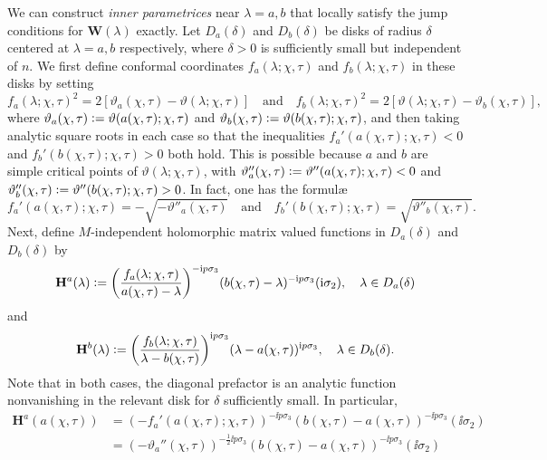 We can construct \emph{inner parametrices} near $\lambda=a,b$ that locally satisfy the jump conditions for $\mathbf{W}(\lambda)$ exactly.  Let $D_a(\delta)$ and $D_b(\delta)$ be disks of radius $\delta$ centered at $\lambda=a,b$ respectively, where $\delta>0$ is sufficiently small but independent of $n$.  We first define conformal coordinates $f_a(\lambda;\chi,\tau)$ and $f_b(\lambda;\chi,\tau)$ in these disks by setting 
\begin{equation}
f_a(\lambda;\chi,\tau)^2=2[\vartheta_a(\chi,\tau)-\vartheta(\lambda;\chi,\tau)]\quad\text{and}\quad
f_b(\lambda;\chi,\tau)^2=2[\vartheta(\lambda;\chi,\tau)-\vartheta_b(\chi,\tau)],
\end{equation}
where $\vartheta_a(\chi,\tau)\vcentcolon=\vartheta(a(\chi,\tau);\chi,\tau)$ and $\vartheta_b(\chi,\tau)\vcentcolon=\vartheta(b(\chi,\tau);\chi,\tau)$, 
and then taking analytic square roots in each case so that the inequalities $f_a'(a(\chi,\tau);\chi,\tau)<0$ and $f_b'(b(\chi,\tau);\chi,\tau)>0$ both hold.  This is possible because $a$ and $b$ are simple critical points of $\vartheta(\lambda;\chi,\tau)$, with $\vartheta''_a(\chi,\tau)\vcentcolon=\vartheta''(a(\chi,\tau);\chi,\tau)<0$ and $\vartheta''_b(\chi,\tau)\vcentcolon=\vartheta''(b(\chi,\tau);\chi,\tau)>0$.  In fact, one has the formul\ae\
\begin{equation}
f_a'(a(\chi,\tau);\chi,\tau)=-\sqrt{-\vartheta''_a(\chi,\tau)}\quad\text{and}\quad
f_b'(b(\chi,\tau);\chi,\tau)=\sqrt{\vartheta''_b(\chi,\tau)}.
\label{eq:Channels-fafb-Derivs}
\end{equation}
Next, define $M$-independent holomorphic matrix valued functions in $D_a(\delta)$ and $D_b(\delta)$ by
\begin{equation}
\mathbf{H}^a(\lambda)\defeq\left(\frac{f_a(\lambda;\chi,\tau)}{a(\chi,\tau)-\lambda}\right)^{-\ii p\sigma_3}(b(\chi,\tau)-\lambda)^{-\ii p\sigma_3}(\ii\sigma_2),\quad\lambda\in D_a(\delta)
\label{eq:Channels-Ha}
\end{equation}
and
\begin{equation}
\mathbf{H}^b(\lambda)\defeq\left(\frac{f_b(\lambda;\chi,\tau)}{\lambda-b(\chi,\tau)}\right)^{\ii p\sigma_3}(\lambda-a(\chi,\tau))^{\ii p\sigma_3},\quad\lambda\in D_b(\delta).  
\label{eq:Channels-Hb}
\end{equation}
Note that in both cases, the diagonal prefactor is an analytic function nonvanishing in the relevant disk for $\delta$ sufficiently small.  In particular,
\begin{equation}
\begin{split}
\mathbf{H}^a(a(\chi,\tau))&=\left(-f_a'(a(\chi,\tau);\chi,\tau)\right)^{-\ii p\sigma_3}(b(\chi,\tau)-a(\chi,\tau))^{-\ii p\sigma_3}(\ii\sigma_2)\\
&=\left(-\vartheta_a''(\chi,\tau)\right)^{-\frac{1}{2}\ii p\sigma_3}(b(\chi,\tau)-a(\chi,\tau))^{-\ii p\sigma_3}(\ii\sigma_2)
\end{split}
\label{eq:Channels-Ha-center}
\end{equation}

